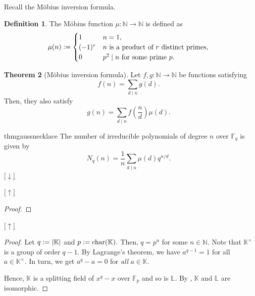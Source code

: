 \documentclass[12pt,oneside]{book}
\theoremstyle{definition}
\newtheorem{thm}{Theorem}
\numberwithin{thm}{chapter}
\newtheorem{defn}[thm]{Definition}
\newcommand{\downsym}{[$\downarrow$]}
\newcommand{\upsym}{[$\uparrow$]}
\newcommand{\deff}[1]{{\color{blue}#1}}
\newcommand{\md}[1]{{\left\lvert #1 \right\lvert}}
\DeclareMathOperator{\chr}{char}
\begin{document}
Recall the M\"obius inversion formula.

\begin{defn}%
    The \deff{M\"obius function} $\mu : \mathbb{N} \to \mathbb{N}$ is defined as
    \begin{equation*} 
        \mu(n) \vcentcolon= \begin{cases}
            1 & n = 1,\\
            (-1)^r & n \text{ is a product of }r \text{ distinct primes},\\
            0 & p^2 \mid n \text{ for some prime }p.
        \end{cases}
    \end{equation*}
\end{defn}

\begin{thm}[M\"obius inversion formula]
    Let $f, g : \mathbb{N} \to \mathbb{N}$ be functions satisfying
    \begin{equation*} 
        f(n) = \sum_{d \mid n} g(d).
    \end{equation*}
    Then, they also satisfy
    \begin{equation*} 
        g(n) = \sum_{d \mid n} f\left(\frac{n}{d}\right)\mu(d).
    \end{equation*}
\end{thm}

\begin{restatable}[Gauss]{thm}{gaussnecklace}
\label{thm:gaussnecklace}
    The number of irreducible polynomials of degree $n$ over $\mathbb{F}_{q}$ is given by
    \begin{equation*} 
        N_q(n) = \frac{1}{n}\sum_{d \mid n} \mu(d)q^{n/d}.
    \end{equation*} \hfill\hyperref[thm:gaussnecklace2]{\downsym}
\end{restatable}

\gaussnecklace*\label{thm:gaussnecklace2}
\begin{flushright}\hyperref[thm:gaussnecklace]{\upsym}\end{flushright}
\begin{proof}
    
\end{proof}



\uniquefinfields*\label{thm:uniquefinfields2}
\begin{flushright}\hyperref[thm:uniquefinfields]{\upsym}\end{flushright}
\begin{proof}
    Let $q \vcentcolon= \md{\mathbb{K}}$ and $p \vcentcolon= \chr(\mathbb{K}).$ Then, $q = p^n$ for some $n \in \mathbb{N}.$ Note that $\mathbb{K}^\times$ is a group of order $q - 1.$ By Lagrange's theorem, we have $a^{q - 1} = 1$ for all $a \in \mathbb{K}^\times.$ In turn, we get $a^q - a = 0$ for \emph{all} $a \in \mathbb{K}.$

    Hence, $\mathbb{K}$ is a splitting field of $x^q - x$ over $\mathbb{F}_p$ and so is $\mathbb{L}.$ By , $\mathbb{K}$ and $\mathbb{L}$ are isomorphic.
\end{proof}
\end{document}
